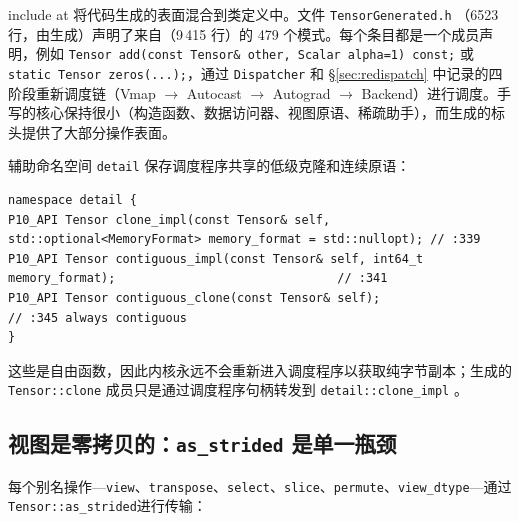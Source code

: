 include at 将代码生成的表面混合到类定义中。文件 \texttt{TensorGenerated.h} （6523 行，由生成）声明了来自（9\,415 行）的 479 个模式。每个条目都是一个成员声明，例如 \texttt{Tensor add(const Tensor\& other, Scalar alpha=1) const;} 或 \texttt{static Tensor zeros(...);}，通过 \texttt{Dispatcher} 和 \S\ref{sec:redispatch} 中记录的四阶段重新调度链（Vmap $\rightarrow$ Autocast $\rightarrow$ Autograd $\rightarrow$ Backend）进行调度。手写的核心保持很小（构造函数、数据访问器、视图原语、稀疏助手），而生成的标头提供了大部分操作表面。

辅助命名空间 \texttt{detail} 保存调度程序共享的低级克隆和连续原语：

\begin{lstlisting}[caption={detail clone surface.}, label=lst:detailclone]
namespace detail {
P10_API Tensor clone_impl(const Tensor& self, std::optional<MemoryFormat> memory_format = std::nullopt); // :339
P10_API Tensor contiguous_impl(const Tensor& self, int64_t memory_format);                               // :341
P10_API Tensor contiguous_clone(const Tensor& self);                                                       // :345 always contiguous
}
\end{lstlisting}

这些是自由函数，因此内核永远不会重新进入调度程序以获取纯字节副本；生成的 \texttt{Tensor::clone} 成员只是通过调度程序句柄转发到 \texttt{detail::clone\_impl} 。

\subsection{视图是零拷贝的：\texttt{as\_strided} 是单一瓶颈}
\label{sec:views}

每个别名操作---\texttt{view}、\texttt{transpose}、\texttt{select}、\texttt{slice}、\texttt{permute}、\texttt{view\_dtype}---通过\texttt{Tensor::as\_strided}进行传输：

